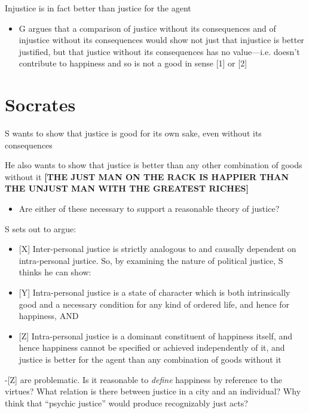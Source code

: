 \documentclass[11pt]{article}
\begin{document}
\noindent Injustice is in fact better than justice for the agent

\begin{itemize}\item{G argues that a comparison of justice without its consequences and of injustice without its consequences would show not just that injustice is better justified, but that justice without its consequences has no value---i.e. doesn't contribute to happiness and so is not a good in sense [1] or [2]}\end{itemize}
\vspace*{-8mm}

\section*{Socrates}

\noindent S wants to show that justice is good for its own sake, even without its consequences
\vspace*{1mm}

\noindent He also wants to show that justice is better than any other combination of goods without it \textbf{[THE JUST MAN ON THE RACK IS HAPPIER THAN THE UNJUST MAN WITH THE GREATEST RICHES]}
\begin{itemize}\item{Are either of these necessary to support a reasonable theory of justice?}\end{itemize}

\noindent S sets out to argue:
\begin{itemize}\item{[X] Inter-personal justice is strictly analogous to and causally dependent on intra-personal justice. So, by examining the nature of political justice, S thinks he can show:}\item{[Y] Intra-personal justice is a state of character which is both intrinsically good and a necessary condition for any kind of ordered life, and hence for happiness, AND}\item{[Z] Intra-personal justice is a dominant constituent of happiness itself, and hence happiness cannot be specified or achieved independently of it, and justice is better for the agent than any combination of goods without it}\end{itemize}

\noindent [X]-[Z] are problematic. Is it reasonable to \emph{define} happiness by reference to the virtues? What relation is there between justice in a city and an individual? Why think that ``psychic justice'' would produce recognizably just acts?
\end{document}
